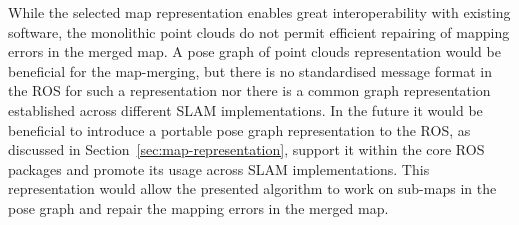 While the selected map representation enables great interoperability with existing software, the monolithic point clouds do not permit efficient repairing of mapping errors in the merged map. A pose graph of point clouds representation would be beneficial for the map-merging, but there is no standardised message format in the \gls{ROS} for such a representation nor there is a common graph representation established across different \gls{SLAM} implementations. In the future it would be beneficial to introduce a portable pose graph representation to the \gls{ROS}, as discussed in Section~\ref{sec:map-representation}, support it within the core \gls{ROS} packages and promote its usage across \gls{SLAM} implementations. This representation would allow the presented algorithm to work on sub-maps in the pose graph and repair the mapping errors in the merged map.
